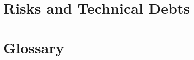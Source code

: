 







\section{Risks and Technical Debts}\label{section-technical-risks}

\section{Glossary}\label{section-glossary}

